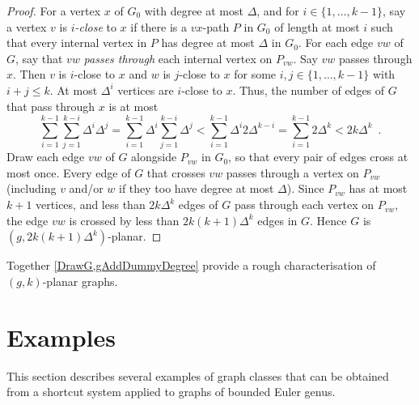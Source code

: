 \documentclass{patmorin}
\renewcommand{\leq}{\leqslant}
\begin{document}
\begin{proof}
For a vertex $x$ of $G_0$ with degree at most $\Delta$, and for $i\in\{1,\dots,k-1\}$, say a vertex $v$ is \emph{$i$-close} to $x$ if there is a $vx$-path $P$ in $G_0$ of length at most $i$ such that every internal vertex in $P$  has degree at most $\Delta$ in $G_0$. 
For each edge $vw$ of $G$, say that $vw$ \emph{passes through} each internal vertex on $P_{vw}$. 
Say $vw$ passes through $x$. Then $v$ is $i$-close to $x$ and $w$ is $j$-close to $x$ for some $i,j\in\{1,\dots,k-1\}$ with $i+j\leq k$. At most $\Delta^{i}$ vertices are $i$-close to $x$. 
Thus, the number of edges of $G$ that pass through $x$ is at most 
$$
\sum_{i=1}^{k-1} \sum_{j=1}^{k-i} \Delta^i \Delta^j 
= \sum_{i=1}^{k-1} \Delta^i  \sum_{j=1}^{k-i} \Delta^j 
< \sum_{i=1}^{k-1} \Delta^i  2 \Delta^{k-i}
= \sum_{i=1}^{k-1} 2\Delta^k 
< 2k \Delta^k \enspace.
$$
Draw each edge $vw$ of $G$ alongside $P_{vw}$ in $G_0$, so that every pair of edges cross at most once. 
Every edge of $G$ that crosses $vw$ passes through a vertex on $P_{vw}$ (including $v$ and/or $w$ if they too have degree at most $\Delta$). Since $P_{vw}$ has at most $k+1$ vertices, and less than $2k\Delta^{k}$ edges of $G$ pass through each vertex on $P_{vw}$, the edge $vw$ is crossed by less than $2k(k+1)\Delta^{k}$ edges in $G$. Hence $G$ is $(g, 2k(k+1)\Delta^{k} )$-planar.
\end{proof}

Together \cref{DrawG,gAddDummyDegree} provide a rough characterisation of $(g,k)$-planar graphs. 

\section{Examples}
\label{Examples}

This section describes several examples of graph classes that can be obtained from a shortcut system applied to graphs of bounded Euler genus.  


\end{document}
